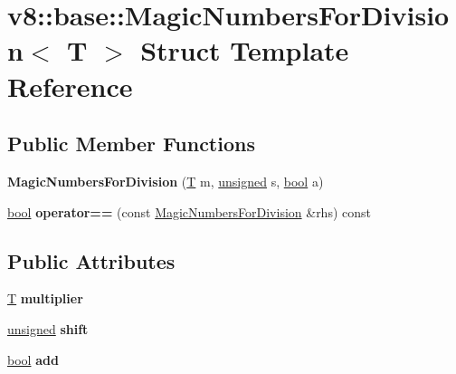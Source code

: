 \hypertarget{structv8_1_1base_1_1MagicNumbersForDivision}{}\section{v8\+:\+:base\+:\+:Magic\+Numbers\+For\+Division$<$ T $>$ Struct Template Reference}
\label{structv8_1_1base_1_1MagicNumbersForDivision}
\subsection*{Public Member Functions}
\begin{DoxyCompactItemize}
\item 
\mbox{\label{structv8_1_1base_1_1MagicNumbersForDivision_a9c8bc5972e416ee5a86d84910f656f80}} 
{\bfseries Magic\+Numbers\+For\+Division} (\mbox{\hyperlink{classv8_1_1internal_1_1torque_1_1T}{T}} m, \mbox{\hyperlink{classunsigned}{unsigned}} s, \mbox{\hyperlink{classbool}{bool}} a)
\item 
\mbox{\label{structv8_1_1base_1_1MagicNumbersForDivision_a01ccaa8769946c914f8e3e39783b34bb}} 
\mbox{\hyperlink{classbool}{bool}} {\bfseries operator==} (const \mbox{\hyperlink{structv8_1_1base_1_1MagicNumbersForDivision}{Magic\+Numbers\+For\+Division}} \&rhs) const
\end{DoxyCompactItemize}
\subsection*{Public Attributes}
\begin{DoxyCompactItemize}
\item 
\mbox{\label{structv8_1_1base_1_1MagicNumbersForDivision_a6e9c4ecc2ab471e0b7a97d83593e7410}} 
\mbox{\hyperlink{classv8_1_1internal_1_1torque_1_1T}{T}} {\bfseries multiplier}
\item 
\mbox{\label{structv8_1_1base_1_1MagicNumbersForDivision_a271ab27a80a90397aa1e254ddb06377f}} 
\mbox{\hyperlink{classunsigned}{unsigned}} {\bfseries shift}
\item 
\mbox{\label{structv8_1_1base_1_1MagicNumbersForDivision_a4ab63c05067197cd03ae86661cffb0b0}} 
\mbox{\hyperlink{classbool}{bool}} {\bfseries add}
\end{DoxyCompactItemize}


